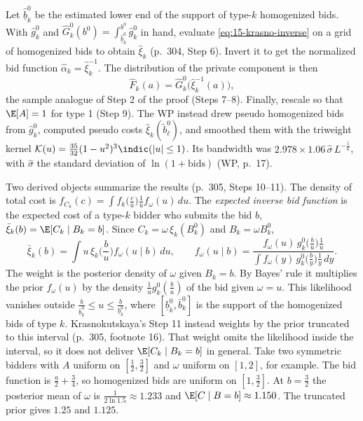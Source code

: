 Let $\hat{\underline b}^0_k$ be the estimated lower end of the support of type-$k$ homogenized bids. With
$\hat g^0_k$ and $\hat G^0_k(b^0)=\int_{\hat{\underline b}^0_k}^{b^0}\hat g^0_k$ in hand, evaluate
\eqref{eq:15-krasno-inverse} on a grid of homogenized bids to obtain $\hat\xi_k$ (p.~304, Step 6).
Invert it to get the normalized bid function $\hat\alpha_k=\hat\xi_k^{-1}$. The distribution of the
private component is then
\[
\hat F_k(a)=\hat G^0_k\big(\hat\xi_k^{-1}(a)\big),
\]
the sample analogue of Step 2 of the proof (Steps 7--8). Finally, rescale so that $\E[A]=1$ for type 1
(Step 9). The WP instead drew pseudo homogenized bids from $\hat g^0_k$, computed pseudo costs
$\hat\xi_k(\tilde b^0_\ell)$, and smoothed them with the triweight kernel
$\mathcal K(u)=\frac{35}{32}(1-u^2)^3\indic(|u|\le1)$. Its bandwidth was
$2.978\times1.06\,\hat\sigma\,L^{-\frac{1}{6}}$, with $\hat\sigma$ the standard deviation of
$\ln(1+\text{bids})$ (WP, p.~17).

Two derived objects summarize the results (p.~305, Steps 10--11). The density of total cost is
$f_{C_k}(c)=\int f_k\big(\frac{c}{u}\big)\frac{1}{u}f_\omega(u)\,du$. The \emph{expected inverse bid
function} is the expected cost of a type-$k$ bidder who submits the bid $b$,
$\bar\xi_k(b)=\E[C_k\mid B_k=b]$. Since $C_k=\omega\,\xi_k(B^0_k)$ and $B_k=\omega B^0_k$,
\[
\bar\xi_k(b)=\int u\,\xi_k\Big(\frac{b}{u}\Big)f_\omega(u\mid b)\,du,\qquad
f_\omega(u\mid b)=\frac{f_\omega(u)\,g^0_k\big(\frac{b}{u}\big)\frac{1}{u}}{\int f_\omega(y)\,g^0_k\big(\frac{b}{y}\big)\frac{1}{y}\,dy}.
\]
The weight is the posterior density of $\omega$ given $B_k=b$. By Bayes' rule it multiplies the prior
$f_\omega(u)$ by the density $\frac{1}{u}g^0_k(\frac{b}{u})$ of the bid given $\omega=u$. This likelihood
vanishes outside $\frac{b}{\bar b^0_k}\le u\le\frac{b}{\underline b^0_k}$, where $[\underline b^0_k,\bar b^0_k]$
is the support of the homogenized bids of type $k$. Krasnokutskaya's Step 11 instead weights by the prior
truncated to this interval (p.~305, footnote 16). That weight omits the likelihood inside the interval, so it
does not deliver $\E[C_k\mid B_k=b]$ in general. Take two symmetric bidders with $A$ uniform on
$[\frac12,\frac32]$ and $\omega$ uniform on $[1,2]$, for example. The bid function is $\frac{a}{2}+\frac34$, so
homogenized bids are uniform on $[1,\frac32]$. At $b=\frac32$ the posterior mean of $\omega$ is
$\frac{1}{2\ln1.5}\approx1.233$ and $\E[C\mid B=b]\approx1.150$. The truncated prior gives $1.25$ and $1.125$.

